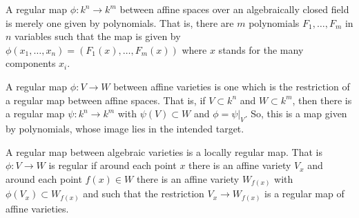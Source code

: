 \documentclass[12pt]{article}
\begin{document}
A regular map $\phi : k^n\to k^m$ between affine spaces over an algebraically closed field is merely one given by polynomials.  That is, there are $m$ polynomials $F_1, \ldots, F_m$ in $n$ variables such that the map is given by $\phi(x_1, \ldots, x_n) = (F_1(x),\ldots, F_m(x))$ where $x$ stands for the many components $x_i$.

A regular map $\phi : V\to W$ between affine varieties is one which is the restriction of a regular map between affine spaces.  That is, if $V\subset k^n$ and $W\subset k^m$, then there is a regular map $\psi : k^n\to k^m$ with $\psi(V)\subset W$ and $\phi = \psi|_V$.  So, this is a map given by polynomials, whose image lies in the intended target.

A regular map between algebraic varieties is a locally regular map.  That is $\phi  : V\to W$ is regular if around each point $x$ there is an affine variety $V_x$ and around each point $f(x)\in W$ there is an affine variety $W_{f(x)}$ with $\phi(V_x)\subset W_{f(x)}$ and such that the restriction $V_x \to W_{f(x)}$ is a regular map of affine varieties.
\end{document}
